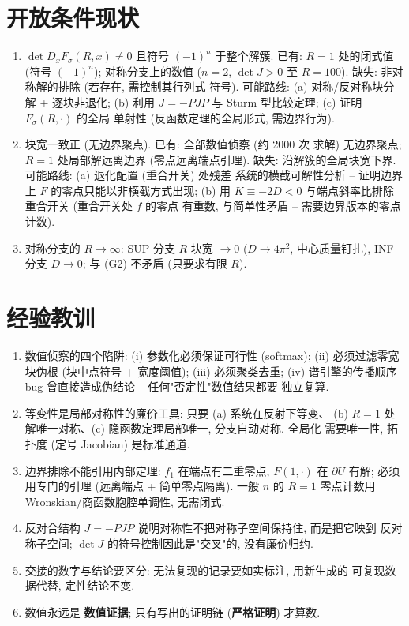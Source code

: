 \documentclass[UTF8]{ctexart}
\newcommand{\STRICT}{\textbf{严格证明}}
\newcommand{\EVIDENCE}{\textbf{数值证据}}
\begin{document}
\section{开放条件现状}\label{sec:open}

\begin{enumerate}
	\item[(G1$'$)] $\det D_xF_\sigma(R,x)\neq0$ 且符号 $(-1)^n$ 于整个解簇.
	已有: $R=1$ 处的闭式值 (符号 $(-1)^n$); 对称分支上的数值 ($n=2$,
	$\det J>0$ 至 $R=100$). 缺失: 非对称解的排除 (若存在, 需控制其行列式
	符号). 可能路线: (a) 对称/反对称块分解 + 逐块非退化; (b) 利用
	$J=-PJP$ 与 Sturm 型比较定理; (c) 证明 $F_\sigma(R,\cdot)$ 的全局
	单射性 (反函数定理的全局形式, 需边界行为).
	\item[(G2)] 块宽一致正 (无边界聚点). 已有: 全部数值侦察 (约 2000 次
	求解) 无边界聚点; $R=1$ 处局部解远离边界 (零点远离端点引理).
	缺失: 沿解簇的全局块宽下界. 可能路线: (a) 退化配置 (重合开关) 处残差
	系统的横截可解性分析 -- 证明边界上 $F$ 的零点只能以非横截方式出现;
	(b) 用 $K\equiv-2D<0$ 与端点斜率比排除重合开关 (重合开关处 $f$ 的零点
	有重数, 与简单性矛盾 -- 需要边界版本的零点计数).
	\item 对称分支的 $R\to\infty$: SUP 分支 $R$ 块宽 $\to0$ ($D\to4\pi^2$,
	中心质量钉扎), INF 分支 $D\to0$; 与 (G2) 不矛盾 (只要求有限 $R$).
\end{enumerate}

\section{经验教训}

\begin{enumerate}
	\item 数值侦察的四个陷阱: (i) 参数化必须保证可行性 (softmax);
	(ii) 必须过滤零宽块伪根 (块中点符号 + 宽度阈值); (iii) 必须聚类去重;
	(iv) 谱引擎的传播顺序 bug 曾直接造成伪结论 -- 任何"否定性"数值结果都要
	独立复算.
	\item 等变性是局部对称性的廉价工具: 只要 (a) 系统在反射下等变、
	(b) $R=1$ 处解唯一对称、(c) 隐函数定理局部唯一, 分支自动对称. 全局化
	需要唯一性, 拓扑度 (定号 Jacobian) 是标准通道.
	\item 边界排除不能引用内部定理: $f_1$ 在端点有二重零点, $F(1,\cdot)$
	在 $\partial U$ 有解; 必须用专门的引理 (远离端点 + 简单零点隔离).
	一般 $n$ 的 $R=1$ 零点计数用 Wronskian/商函数胞腔单调性, 无需闭式.
	\item 反对合结构 $J=-PJP$ 说明对称性不把对称子空间保持住, 而是把它映到
	反对称子空间; $\det J$ 的符号控制因此是"交叉"的, 没有廉价归约.
	\item 交接的数字与结论要区分: 无法复现的记录要如实标注, 用新生成的
	可复现数据代替, 定性结论不变.
	\item 数值永远是 \EVIDENCE; 只有写出的证明链 (\STRICT) 才算数.
\end{enumerate}
\end{document}
